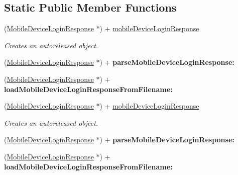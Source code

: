 \subsection*{Static Public Member Functions}
\begin{DoxyCompactItemize}
\item 
(\hyperlink{interface_mobile_device_login_response}{MobileDeviceLoginResponse} $\ast$) + \hyperlink{interface_mobile_device_login_response_a363c8d6e00bd50c759900c29481ded4b}{mobileDeviceLoginResponse}
\begin{DoxyCompactList}\small\item\em Creates an autoreleased object. \item\end{DoxyCompactList}\item 
\hypertarget{interface_mobile_device_login_response_a88648f43c7bd8e5edb83f1dbbf1ec018}{
(\hyperlink{interface_mobile_device_login_response}{MobileDeviceLoginResponse} $\ast$) + {\bfseries parseMobileDeviceLoginResponse:}}
\label{interface_mobile_device_login_response_a88648f43c7bd8e5edb83f1dbbf1ec018}

\item 
\hypertarget{interface_mobile_device_login_response_a5c7ae1d367157437ce6a1618d1f6b801}{
(\hyperlink{interface_mobile_device_login_response}{MobileDeviceLoginResponse} $\ast$) + {\bfseries loadMobileDeviceLoginResponseFromFilename:}}
\label{interface_mobile_device_login_response_a5c7ae1d367157437ce6a1618d1f6b801}

\item 
(\hyperlink{interface_mobile_device_login_response}{MobileDeviceLoginResponse} $\ast$) + \hyperlink{interface_mobile_device_login_response_a363c8d6e00bd50c759900c29481ded4b}{mobileDeviceLoginResponse}
\begin{DoxyCompactList}\small\item\em Creates an autoreleased object. \item\end{DoxyCompactList}\item 
\hypertarget{interface_mobile_device_login_response_a88648f43c7bd8e5edb83f1dbbf1ec018}{
(\hyperlink{interface_mobile_device_login_response}{MobileDeviceLoginResponse} $\ast$) + {\bfseries parseMobileDeviceLoginResponse:}}
\label{interface_mobile_device_login_response_a88648f43c7bd8e5edb83f1dbbf1ec018}

\item 
\hypertarget{interface_mobile_device_login_response_a5c7ae1d367157437ce6a1618d1f6b801}{
(\hyperlink{interface_mobile_device_login_response}{MobileDeviceLoginResponse} $\ast$) + {\bfseries loadMobileDeviceLoginResponseFromFilename:}}
\label{interface_mobile_device_login_response_a5c7ae1d367157437ce6a1618d1f6b801}


\end{DoxyCompactItemize}
